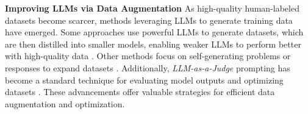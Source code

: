\textbf{Improving LLMs via Data Augmentation}
As high-quality human-labeled datasets become scarcer, methods leveraging LLMs to generate training data have emerged. Some approaches use powerful LLMs to generate datasets, which are then distilled into smaller models, enabling weaker LLMs to perform better with high-quality data \citep{chen2023alpagasus}. Other methods focus on self-generating problems or responses to expand datasets \citep{wang2022self}. Additionally, \textit{LLM-as-a-Judge} prompting has become a standard technique for evaluating model outputs and optimizing datasets \citep{dubois2024alpacafarm,bai2024benchmarking,saha2023branch,yuan2024self}. These advancements offer valuable strategies for efficient data augmentation and optimization.

